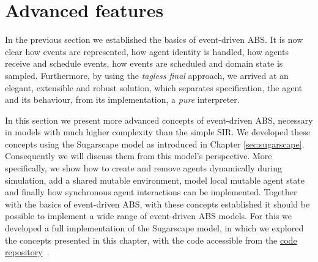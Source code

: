 \section{Advanced features}
\label{sec:advanced_eventdriven_ABS}

In the previous section we established the basics of event-driven ABS. It is now clear how events are represented, how agent identity is handled, how agents receive and schedule events, how events are scheduled and domain state is sampled. Furthermore, by using the \textit{tagless final} approach, we arrived at an elegant, extensible and robust solution, which separates specification, the agent and its behaviour, from its implementation, a \textit{pure} interpreter. 

In this section we present more advanced concepts of event-driven ABS, necessary in models with much higher complexity than the simple SIR. We developed these concepts using the Sugarscape model as introduced in Chapter \ref{sec:sugarscape}. Consequently we will discuss them from this model's perspective. More specifically, we show how to create and remove agents dynamically during simulation, add a shared mutable environment, model local mutable agent state and finally how synchronous agent interactions can be implemented. Together with the basics of event-driven ABS, with these concepts established it should be possible to implement a wide range of event-driven ABS models. For this we developed a full implementation of the Sugarscape model, in which we explored the concepts presented in this chapter, with the code accessible from the \href{https://github.com/thalerjonathan/haskell-sugarscape}{code repository}~\cite{thaler_sugarscape_repository}.









